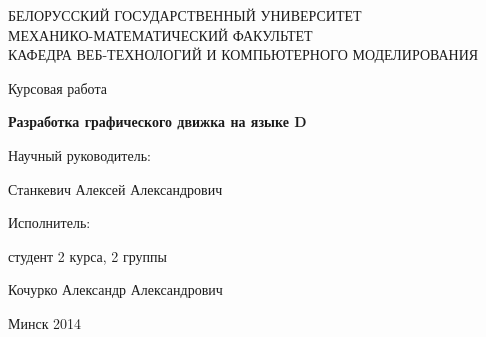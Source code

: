 \begin{titlepage}
\newpage

\begin{center}
БЕЛОРУССКИЙ ГОСУДАРСТВЕННЫЙ УНИВЕРСИТЕТ \\
МЕХАНИКО-МАТЕМАТИЧЕСКИЙ ФАКУЛЬТЕТ\\
КАФЕДРА ВЕБ-ТЕХНОЛОГИЙ И КОМПЬЮТЕРНОГО МОДЕЛИРОВАНИЯ
\end{center}
 
\vspace{14em}

\begin{center}
Курсовая работа
\end{center}

\begin{center}
\Large \textbf{Разработка графического движка на языке D}
\end{center}

\vspace{11em}
 
\begin{flushright}
\parbox{0.45\textwidth}{
Научный руководитель:
\vspace{0.25em}

Станкевич Алексей Александрович
\vspace{2em}

Исполнитель:
\vspace{0.25em}

студент 2 курса, 2 группы

Кочурко Александр Александрович
}%
\end{flushright}
 
\vspace{\fill}

\begin{center}
Минск 2014
\end{center}

\end{titlepage} 
